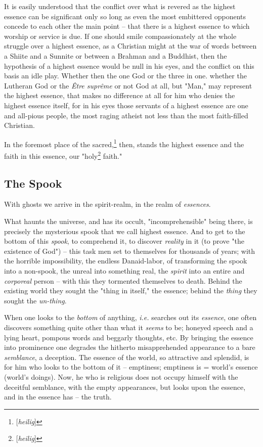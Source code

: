 \documentclass[a4paper]{book}
\begin{document}
It is easily understood that the conflict over what is revered as the highest 
essence can be significant only so long as even the most embittered opponents 
concede to each other the main point -- that there is a highest essence to 
which worship or service is due. If one should smile compassionately at the 
whole struggle over a highest essence, as a Christian might at the war of 
words between a Shiite and a Sunnite or between a Brahman and a Buddhist, then 
the hypothesis of a highest essence would be null in his eyes, and the 
conflict on this basis an idle play. Whether then the one God or the three in 
one. whether the Lutheran God or the \textit{\^Etre supr\^eme} or not God at 
all, but "{}Man,"{} may represent the highest essence, that makes no 
difference at all for him who denies the highest essence itself, for in his 
eyes those servants of a highest essence are one and all-pious people, the 
most raging atheist not less than the most faith-filled Christian.

In the foremost place of the sacred,\footnote{[\textit{heilig}]} then, stands 
the highest essence and the faith in this essence, our 
"{}holy\footnote{[\textit{heilig}]} faith."{}

\medskip{}

\subsection[The Spook]{\centering The Spook}

With ghosts we arrive in the spirit-realm, in the realm of \textit{essences}.

What haunts the universe, and has its occult, "{}incomprehensible"{} being 
there, is precisely the mysterious spook that we call highest essence. And to 
get to the bottom of this \textit{spook}, to comprehend it, to discover 
\textit{reality} in it (to prove "{}the existence of God"{}) -- this task men 
set to themselves for thousands of years; with the horrible impossibility, the 
endless Danaid-labor, of transforming the spook into a non-spook, the unreal 
into something real, the \textit{spirit} into an entire and \textit{corporeal} 
person -- with this they tormented themselves to death. Behind the existing 
world they sought the "{}thing in itself,"{} the essence; behind the 
\textit{thing} they sought the \textit{un-thing}.

When one looks to the \textit{bottom} of anything, \textit{i.e.} searches out 
its \textit{essence}, one often discovers something quite other than what it 
\textit{seems} to be; honeyed speech and a lying heart, pompous words and 
beggarly thoughts, etc. By bringing the essence into prominence one degrades 
the hitherto misapprehended appearance to a bare \textit{semblance}, a 
deception. The essence of the world, so attractive and splendid, is for him 
who looks to the bottom of it -- emptiness; emptiness is = world's essence 
(world's doings). Now, he who is religious does not occupy himself with the 
deceitful semblance, with the empty appearances, but looks upon the essence, 
and in the essence has -- the truth.
\end{document}
